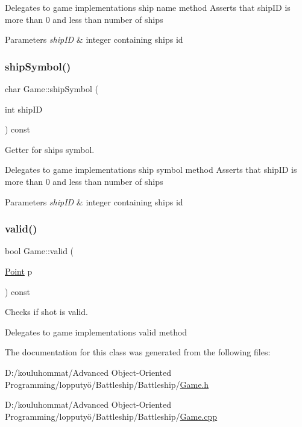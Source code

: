 Delegates to game implementations ship name method Asserts that ship\+ID is more than 0 and less than number of ships 
\begin{DoxyParams}{Parameters}
{\em ship\+ID} & integer containing ship\textquotesingle{}s id \\
\hline
\end{DoxyParams}
\mbox{\label{class_game_a4d7e709c85b6abd5defa24f5f78cd1d1}} 
\subsubsection{\texorpdfstring{ship\+Symbol()}{shipSymbol()}}
{\footnotesize\ttfamily char Game\+::ship\+Symbol (\begin{DoxyParamCaption}\item[{int}]{ship\+ID }\end{DoxyParamCaption}) const}



Getter for ship\textquotesingle{}s symbol. 

Delegates to game implementations ship symbol method Asserts that ship\+ID is more than 0 and less than number of ships 
\begin{DoxyParams}{Parameters}
{\em ship\+ID} & integer containing ship\textquotesingle{}s id \\
\hline
\end{DoxyParams}
\mbox{\label{class_game_a3ec9ae2ce5d1ac1cbf4ed18aa7141744}} 
\subsubsection{\texorpdfstring{valid()}{valid()}}
{\footnotesize\ttfamily bool Game\+::valid (\begin{DoxyParamCaption}\item[{\mbox{\hyperlink{class_point}{Point}}}]{p }\end{DoxyParamCaption}) const}



Checks if shot is valid. 

Delegates to game implementations valid method 

The documentation for this class was generated from the following files\+:\begin{DoxyCompactItemize}
\item 
D\+:/kouluhommat/\+Advanced Object-\/\+Oriented Programming/lopputyö/\+Battleship/\+Battleship/\mbox{\hyperlink{_game_8h}{Game.\+h}}\item 
D\+:/kouluhommat/\+Advanced Object-\/\+Oriented Programming/lopputyö/\+Battleship/\+Battleship/\mbox{\hyperlink{_game_8cpp}{Game.\+cpp}}\end{DoxyCompactItemize}
